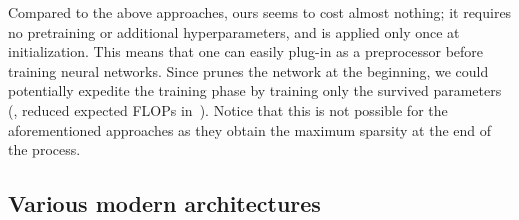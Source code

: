 Compared to the above approaches, ours seems to cost almost nothing;
it requires no pretraining or additional hyperparameters, and is applied only once at initialization.
This means that one can easily plug-in \snip{} as a preprocessor before training neural networks.
Since \snip{} prunes the network at the beginning, we could potentially expedite the training phase by training only the survived parameters (\eg, reduced expected FLOPs in~\cite{louizos2017learning}).
Notice that this is not possible for the aforementioned approaches as they obtain the maximum sparsity at the end of the process.



\subsection{Various modern architectures}

